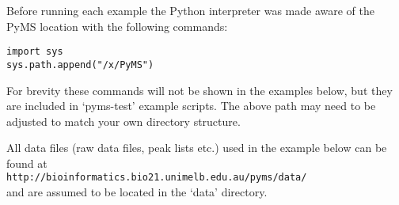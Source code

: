Before running each example the Python interpreter was made aware of the
PyMS location with the following commands:

\begin{verbatim}
import sys
sys.path.append("/x/PyMS")
\end{verbatim}

For brevity these commands will not be shown in the examples below, but
they are included in `pyms-test' example scripts.  The above path may need
to be adjusted to match your own directory structure.

All data files (raw data files, peak lists etc.) used in the example below
can be found at \\
{\tt http://bioinformatics.bio21.unimelb.edu.au/pyms/data/} \\
and are assumed to be located in the `data' directory.


